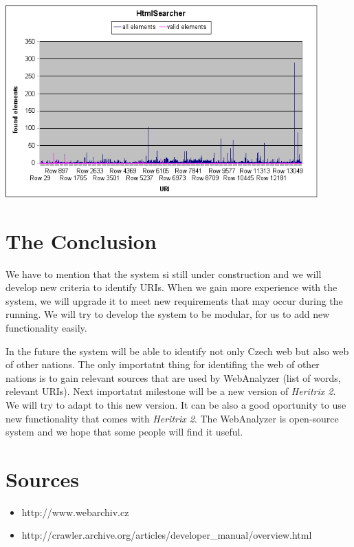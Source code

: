 \documentclass[11pt,a4paper]{article}
\begin{document}
\begin{center}
\includegraphics[width=120mm]{html.png}
\end{center}


\newpage
\section{The Conclusion}

We have to mention that the system si still under construction and we will develop new criteria to identify URIs. When we gain more experience with the system, we will upgrade it to meet new requirements that may occur during the running. We will try to develop the system to be modular, for us to add new functionality easily. 

In the future the system will be able to identify not only Czech web but also web of other nations. The only importatnt thing for identifing the web of other nations is to gain relevant sources that are used by WebAnalyzer (list of words, relevant URIs). Next importatnt milestone will be a new version of \emph{Heritrix 2}. We will try to adapt to this new version. It can be also a good oportunity to use new functionality that comes with \emph{Heritrix 2}. The WebAnalyzer is open-source system and we hope that some people will find it useful.


\newpage
\section{Sources}

\begin{itemize}
\item http://www.webarchiv.cz
\item http://crawler.archive.org/articles/developer\_manual/overview.html
\end{itemize}
\end{document}
